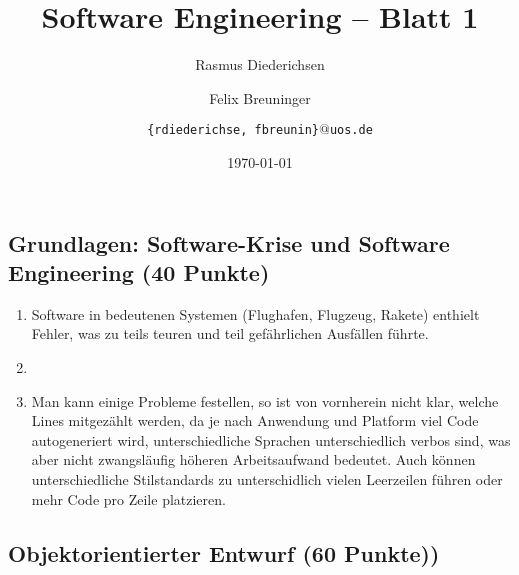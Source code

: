 \documentclass{scrartcl}
\title{\rmfamily Software Engineering -- Blatt 1}
\author{Rasmus Diederichsen \and Felix Breuninger\and %
   \texttt{\{rdiederichse, fbreunin\}$@$uos.de}
}
\date{\today}
\begin{document}
\selectfont
\maketitle


\setcounter{section}{1}
\setcounter{subsection}{1}
\subsection{Grundlagen: Software-Krise und Software Engineering (40 Punkte)}

\begin{enumerate}
   \item Software in bedeutenen Systemen (Flughafen, Flugzeug, Rakete) enthielt
      Fehler, was zu teils teuren und teil gefährlichen Ausfällen führte. %
   \item %
   \item Man kann einige Probleme festellen, so ist von vornherein nicht klar,
      welche Lines mitgezählt werden, da je nach Anwendung und Platform viel Code
      autogeneriert wird, unterschiedliche Sprachen unterschiedlich verbos sind,
      was aber nicht zwangsläufig höheren Arbeitsaufwand bedeutet. Auch können
      unterschiedliche Stilstandards zu unterschidlich vielen Leerzeilen führen
      oder mehr Code pro Zeile platzieren.
\end{enumerate}


\subsection{Objektorientierter Entwurf (60 Punkte))}
\end{document}
